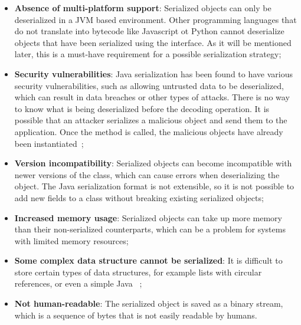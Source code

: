 \begin{itemize}
	\item \textbf{Absence of multi-platform support}: Serialized objects can only be deserialized in a JVM based environment. Other programming languages that do not translate into bytecode like Javascript ot Python cannot deserialize objects that have been serialized using the  interface. As it will be mentioned later, this is a must-have requirement for a possible serialization strategy;
	\item \textbf{Security vulnerabilities}: Java serialization has been found to have various security vulnerabilities, such as allowing untrusted data to be deserialized, which can result in data breaches or other types of attacks. There is no way to know what is being deserialized before the decoding operation. It is possible that an attacker serializes a malicious object and send them to the application. Once the  method is called, the malicious objects have already been instantiated~\cite{AvoidJav95:online};
	\item \textbf{Version incompatibility}: Serialized objects can become incompatible with newer versions of the class, which can cause errors when deserializing the object. The Java serialization format is not extensible, so it is not possible to add new fields to a class without breaking existing serialized objects;
	\item \textbf{Increased memory usage}: Serialized objects can take up more memory than their non-serialized counterparts, which can be a problem for systems with limited memory resources;
	\item \textbf{Some complex data structure cannot be serialized}: It is difficult to store certain types of data structures, for example lists with circular references, or even a simple Java ~\cite{Optional58:online};
	\item \textbf{Not human-readable}: The serialized object is saved as a binary stream, which is a sequence of bytes that is not easily readable by humans.
\end{itemize}

